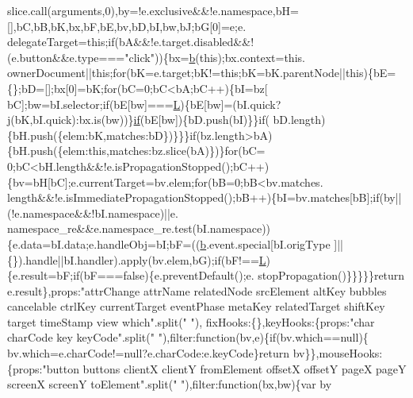 \begin{DoxyCode}
      slice.call(arguments,0),by=!e.exclusive&&!e.namespace,bH=[],bC,bB,bK,bx,bF,bE,bv,bD,bI,bw,bJ;bG[0]=e;e.
      delegateTarget=\textcolor{keyword}{this};\textcolor{keywordflow}{if}(bA&&!e.target.disabled&&!(e.button&&e.type===\textcolor{stringliteral}{"click"}))\{bx=\hyperlink{a00039_aa4026ad5544b958e54ce5e106fa1c805}{b}(\textcolor{keyword}{this});bx.context=this.
      ownerDocument||\textcolor{keyword}{this};\textcolor{keywordflow}{for}(bK=e.target;bK!=\textcolor{keyword}{this};bK=bK.parentNode||\textcolor{keyword}{this})\{bE=\{\};bD=[];bx[0]=bK;\textcolor{keywordflow}{for}(bC=0;bC<bA;bC++)\{bI=bz[
      bC];bw=bI.selector;\textcolor{keywordflow}{if}(bE[bw]===\hyperlink{a00039_a38ee4c0b5f4fe2a18d0c783af540d253}{L})\{bE[bw]=(bI.quick?j(bK,bI.quick):bx.is(bw))\}\hyperlink{a00039_a9db6d45a025ad692282fe23e69eeba43}{if}(bE[bw])\{bD.push(bI)\}\}\textcolor{keywordflow}{if}(
      bD.length)\{bH.push(\{elem:bK,matches:bD\})\}\}\}\textcolor{keywordflow}{if}(bz.length>bA)\{bH.push(\{elem:\textcolor{keyword}{this},matches:bz.slice(bA)\})\}\textcolor{keywordflow}{for}(bC=
      0;bC<bH.length&&!e.isPropagationStopped();bC++)\{bv=bH[bC];e.currentTarget=bv.elem;\textcolor{keywordflow}{for}(bB=0;bB<bv.matches.
      length&&!e.isImmediatePropagationStopped();bB++)\{bI=bv.matches[bB];\textcolor{keywordflow}{if}(by||(!e.namespace&&!bI.namespace)||e.
      namespace\_re&&e.namespace\_re.test(bI.namespace))\{e.data=bI.data;e.handleObj=bI;bF=((\hyperlink{a00039_aa4026ad5544b958e54ce5e106fa1c805}{b}.event.special[bI.origType
      ]||\{\}).handle||bI.handler).apply(bv.elem,bG);\textcolor{keywordflow}{if}(bF!==\hyperlink{a00039_a38ee4c0b5f4fe2a18d0c783af540d253}{L})\{e.result=bF;\textcolor{keywordflow}{if}(bF===\textcolor{keyword}{false})\{e.preventDefault();e.
      stopPropagation()\}\}\}\}\}\textcolor{keywordflow}{return} e.result\},props:\textcolor{stringliteral}{"attrChange attrName relatedNode srcElement altKey bubbles
       cancelable ctrlKey currentTarget eventPhase metaKey relatedTarget shiftKey target timeStamp view which"}.split(\textcolor{stringliteral}{" "}),
      fixHooks:\{\},keyHooks:\{props:\textcolor{stringliteral}{"char charCode key keyCode"}.split(\textcolor{stringliteral}{" "}),filter:\textcolor{keyword}{function}(bv,e)\{\textcolor{keywordflow}{if}(bv.which==null)\{
      bv.which=e.charCode!=null?e.charCode:e.keyCode\}\textcolor{keywordflow}{return} bv\}\},mouseHooks:\{props:\textcolor{stringliteral}{"button buttons clientX clientY
       fromElement offsetX offsetY pageX pageY screenX screenY toElement"}.split(\textcolor{stringliteral}{" "}),filter:\textcolor{keyword}{function}(bx,bw)\{var by

\end{DoxyCode}
